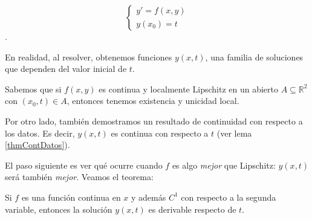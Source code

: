 \documentclass[nochap]{apuntes}
\begin{document}
\[ \begin{cases}
y' = f(x,y) \\
y(x_0) = t
\end{cases} \]. 

En realidad, al resolver, obtenemos funciones $y(x,t)$, una familia de soluciones que dependen del valor inicial de $t$. 

Sabemos que si $f(x,y)$ es continua y localmente Lipschitz en un abierto $A⊆ℝ^2$ con $(x_0,t)∈A$, entonces tenemos existencia y unicidad local.

Por otro lado, también demostramos un resultado de continuidad con respecto a los datos. Es decir, $y(x,t)$ es continua con respecto a $t$ (ver lema \ref{thmContDatos}). 

El paso siguiente es ver qué ocurre cuando $f$ es algo \textit{mejor} que Lipschitz: $y(x,t)$ será también \textit{mejor}. Veamos el teorema:

\begin{theorem} Si $f$ es una función continua en $x$ y además $C^1$ con respecto a la segunda variable, entonces la solución $y(x,t)$ es derivable respecto de $t$.
\end{theorem}
\end{document}
